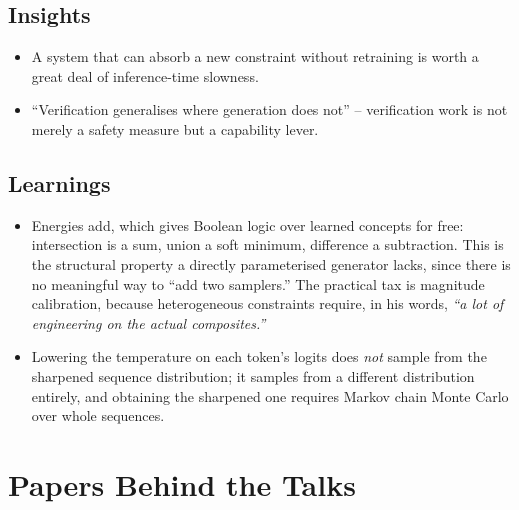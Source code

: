\documentclass[11pt]{article}
\begin{document}
\subsection*{Insights}
\begin{itemize}
    \item A system that can absorb a new constraint without retraining is worth a great deal of inference-time slowness.
    \item ``Verification generalises where generation does not'' -- verification work is not merely a safety measure but a capability lever.
\end{itemize}

\subsection*{Learnings}
\begin{itemize}
    \item Energies add, which gives Boolean logic over learned concepts for free: intersection is a sum, union a soft minimum, difference a subtraction. This is the structural property a directly parameterised generator lacks, since there is no meaningful way to ``add two samplers.'' The practical tax is magnitude calibration, because heterogeneous constraints require, in his words, \emph{``a lot of engineering on the actual composites.''}
    \item Lowering the temperature on each token's logits does \emph{not} sample from the sharpened sequence distribution; it samples from a different distribution entirely, and obtaining the sharpened one requires Markov chain Monte Carlo over whole sequences.
\end{itemize}

\section*{Papers Behind the Talks}
\end{document}
